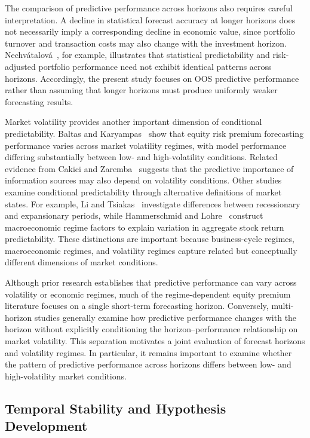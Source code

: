 \documentclass[12pt,twoside]{ord}
\begin{document}
The comparison of predictive performance across horizons also requires careful interpretation. A decline in statistical forecast accuracy at longer horizons does not necessarily imply a corresponding decline in economic value, since portfolio turnover and transaction costs may also change with the investment horizon. Nechv{\'a}talov{\'a}~\cite{nechvatalova2024}, for example, illustrates that statistical predictability and risk-adjusted portfolio performance need not exhibit identical patterns across horizons. Accordingly, the present study focuses on OOS predictive performance rather than assuming that longer horizons must produce uniformly weaker forecasting results.

Market volatility provides another important dimension of conditional predictability. Baltas and Karyampas~\cite{baltas2018} show that equity risk premium forecasting performance varies across market volatility regimes, with model performance differing substantially between low- and high-volatility conditions. Related evidence from Cakici and Zaremba~\cite{cakici2025} suggests that the predictive importance of information sources may also depend on volatility conditions. Other studies examine conditional predictability through alternative definitions of market states. For example, Li and Tsiakas~\cite{li2017} investigate differences between recessionary and expansionary periods, while Hammerschmid and Lohre~\cite{hammerschmid2018} construct macroeconomic regime factors to explain variation in aggregate stock return predictability. These distinctions are important because business-cycle regimes, macroeconomic regimes, and volatility regimes capture related but conceptually different dimensions of market conditions.

Although prior research establishes that predictive performance can vary across volatility or economic regimes, much of the regime-dependent equity premium literature focuses on a single short-term forecasting horizon. Conversely, multi-horizon studies generally examine how predictive performance changes with the horizon without explicitly conditioning the horizon--performance relationship on market volatility. This separation motivates a joint evaluation of forecast horizons and volatility regimes. In particular, it remains important to examine whether the pattern of predictive performance across horizons differs between low- and high-volatility market conditions.

\subsection{Temporal Stability and Hypothesis Development}
\end{document}
